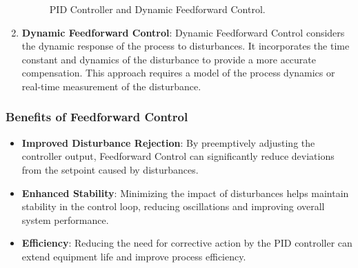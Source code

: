 \begin{enumerate}
\begin{figure}[ht]
{
              }
              \caption{PID Controller and Dynamic Feedforward Control.}
              \label{fig:_pid_ff_dyn}
          \end{figure}
    \item \textbf{Dynamic Feedforward Control}: Dynamic Feedforward Control considers the dynamic response of the process to disturbances. It incorporates the time constant and dynamics of the disturbance to provide a more accurate compensation. This approach requires a model of the process dynamics or real-time measurement of the disturbance.
\end{enumerate}

\subsubsection{Benefits of Feedforward Control}

\begin{itemize}
    \item \textbf{Improved Disturbance Rejection}: By preemptively adjusting the controller output, Feedforward Control can significantly reduce deviations from the setpoint caused by disturbances.

    \item \textbf{Enhanced Stability}: Minimizing the impact of disturbances helps maintain stability in the control loop, reducing oscillations and improving overall system performance.

    \item \textbf{Efficiency}: Reducing the need for corrective action by the PID controller can extend equipment life and improve process efficiency.
\end{itemize}

